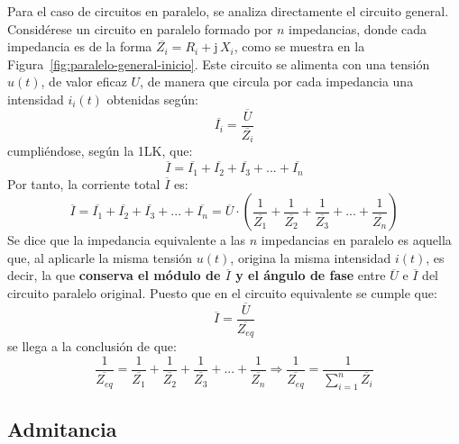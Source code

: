 Para el caso de circuitos en paralelo, se analiza directamente el
circuito general.
Considérese un circuito en paralelo formado por $n$ impedancias, donde
cada impedancia es de la forma $\overline{Z_i}=R_i+\mathrm{j}\,X_i$,
como se muestra en la Figura~\ref{fig:paralelo-general-inicio}. Este
circuito se alimenta con una tensión $u(t)$, de valor eficaz $U$, de
manera que circula por cada impedancia una intensidad $i_i(t)$
obtenidas según:
\begin{equation*}
  \overline{I_i}=\dfrac{\overline{U}}{\overline{Z_i}}
\end{equation*}
cumpliéndose, según la 1LK, que:
\begin{equation*}
  \overline{I}=\overline{I_1}+\overline{I_2}+\overline{I_3}+...+\overline{I_n}
\end{equation*}
Por tanto, la corriente total $\overline{I}$ es:
\begin{equation*}
  \overline{I}=\overline{I_1}+\overline{I_2}+\overline{I_3}+...+\overline{I_n}=\overline{U} \cdot\left(\dfrac{1}{\overline{Z_1}}+\dfrac{1}{\overline{Z_2}}+\dfrac{1}{\overline{Z_3}}+...+\dfrac{1}{\overline{Z_n}}\right)
\end{equation*}
Se dice que la impedancia equivalente a las $n$ impedancias en
paralelo es aquella que, al aplicarle la misma tensión $u(t)$, origina
la misma intensidad $i(t)$, es decir, la que \textbf{conserva el
  módulo de $\overline{I}$ y el ángulo de fase} entre $\overline{U}$ e
$\overline{I}$ del circuito paralelo original. Puesto que en el
circuito equivalente se cumple que:
\begin{equation*}
  \overline{I}=\dfrac{\overline{U}}{\overline{Z_{eq}}}
\end{equation*}
se llega a la conclusión de que:
\begin{equation}
  \dfrac{1}{\overline{Z_{eq}}}=\dfrac{1}{\overline{Z_1}}+\dfrac{1}{\overline{Z_2}}+\dfrac{1}{\overline{Z_3}}+...+\dfrac{1}{\overline{Z_n}}\Rightarrow \boxed{\dfrac{1}{\overline{Z_{eq}}}=\dfrac{1}{\displaystyle\sum_{i=1}^n \overline{Z_i}}}
\end{equation}
	
\subsection{Admitancia}
	
